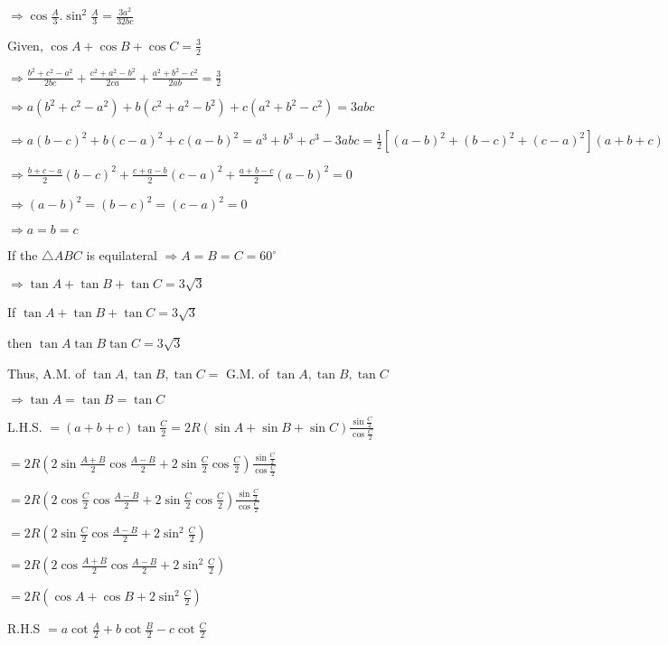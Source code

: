   $\Rightarrow \cos\frac{A}{3}.\sin^2\frac{A}{3} = \frac{3a^2}{32bc}$

\item Given, $\cos A + \cos B + \cos C = \frac{3}{2}$

  $\Rightarrow \frac{b^2 + c^2 - a^2}{2bc} + \frac{c^2 + a^2 - b^2}{2ca} + \frac{a^2 + b^2 - c^2}{2ab} = \frac{3}{2}$

  $\Rightarrow a(b^2 + c^2 - a^2) + b(c^2 + a^2 - b^2) + c(a^2 + b^2 - c^2) = 3abc$

  $\Rightarrow a(b - c)^2 + b(c - a)^2 + c(a - b)^2 = a^3 + b^3 + c^3 - 3abc = \frac{1}{2}[(a - b)^2 + (b - c)^2 + (c -
  a)^2](a + b + c)$

  $\Rightarrow \frac{b + c - a}{2}(b - c)^2 + \frac{c + a - b}{2}(c - a)^2 + \frac{a + b - c}{2}(a - b)^2 = 0$

  $\Rightarrow (a - b)^2 = (b - c)^2 = (c - a)^2 = 0$

  $\Rightarrow a = b = c$

\item If the $\triangle ABC$ is equilateral $\Rightarrow A = B = C = 60^\circ$

  $\Rightarrow \tan A + \tan B + \tan C = 3\sqrt{3}$

  If $\tan A + \tan B + \tan C = 3\sqrt{3}$

  then $\tan A\tan B\tan C = 3\sqrt{3}$

  Thus, A.M. of $\tan A, \tan B, \tan C =$ G.M. of $\tan A, \tan B, \tan C$

  $\Rightarrow \tan A = \tan B = \tan C$

\item L.H.S. $= (a + b + c)\tan\frac{C}{2} = 2R(\sin A + \sin B + \sin C)\frac{\sin\frac{C}{2}}{\cos\frac{C}{2}}$

  $= 2R\left(2\sin\frac{A + B}{2}\cos\frac{A - B}{2} + 2\sin\frac{C}{2}\cos\frac{C}{2}\right)\frac{\sin\frac{C}{2}}{\cos\frac{C}{2}}$

  $= 2R\left(2\cos\frac{C}{2}\cos\frac{A - B}{2} +
  2\sin\frac{C}{2}\cos\frac{C}{2}\right)\frac{\sin\frac{C}{2}}{\cos\frac{C}{2}}$

  $= 2R\left(2\sin\frac{C}{2}\cos\frac{A - B}{2} + 2\sin^2\frac{C}{2}\right)$

  $= 2R\left(2\cos\frac{A + B}{2}\cos\frac{A - B}{2} + 2\sin^2\frac{C}{2}\right)$

  $= 2R\left(\cos A + \cos B + 2\sin^2\frac{C}{2}\right)$

  R.H.S $= a\cot\frac{A}{2} + b\cot\frac{B}{2} - c\cot\frac{C}{2}$

